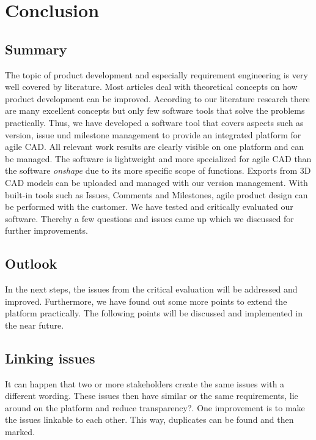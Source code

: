 \section{Conclusion}
\label{sec:conclusion}

\subsection*{Summary} 
The topic of product development and especially requirement engineering is very well covered by literature. Most articles deal with theoretical concepts on how product development can be improved. According to our literature research there are many excellent concepts but only few software tools that solve the problems practically. Thus, we have developed a software tool that covers aspects such as version, issue und milestone management to provide an integrated platform for agile CAD. All relevant work results are clearly visible on one platform and can be managed. The software is lightweight and more specialized for agile CAD than the software \textit{onshape} due to its more specific scope of functions. Exports from 3D CAD models can be uploaded and managed with our version management. With built-in tools such as Issues, Comments and Milestones, agile product design can be performed with the customer. We have tested and critically evaluated our software. Thereby a few questions and issues came up which we discussed for further improvements.

\subsection*{Outlook}
In the next steps, the issues from the critical evaluation will be addressed and improved. Furthermore, we have found out some more points to extend the platform practically. The following points will be discussed and implemented in the near future.

\subsection*{Linking issues}
It can happen that two or more stakeholders create the same issues with a different wording. These issues then have similar or the same requirements, lie around on the platform and reduce transparency?. One improvement is to make the issues linkable to each other. This way, duplicates can be found and then marked.

